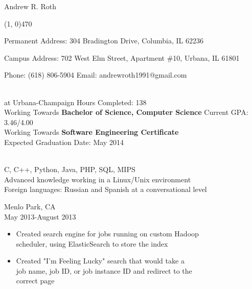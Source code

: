 \documentclass[11pt]{article}
\begin{document}
  \centerline{{\Huge \sc Andrew R. Roth}}
  \noindent\line(1, 0){470}\\
  \centerline{
    Permanent Address:
      304 Bradington Drive,
      Columbia,
      IL 62236
  }
  \centerline{
    Campus Address:
      702 West Elm Street,
      Apartment \#10,
      Urbana,
      IL 61801
  }
  \centerline{
    Phone: (618) 806-5904
    \indent Email: andrewroth1991@gmail.com
  }

  \bigskip
  \bigskip

  \\
     at Urbana-Champaign \hfill 
      Hours Completed: 138\\
    \indent Working Towards {\bf Bachelor of Science, Computer Science} \hfill 
      Current GPA: 3.46/4.00\\
    \indent Working Towards {\bf Software Engineering Certificate}\\
    \indent Expected Graduation Date: May 2014

  \bigskip
  \bigskip

  \\
    \indent C, C++, Python, Java, PHP, SQL, MIPS\\
    \indent Advanced knowledge working in a Linux/Unix environment\\
    \indent Foreign languages: Russian and Spanish at a conversational level

  \bigskip
  \bigskip

    \smallskip

     \hfill Menlo Park, CA\\
     \hfill May 2013-August 2013
    \begin{itemize}[noitemsep,topsep=0pt,leftmargin=52pt]
      \item Created search engine for jobs running on custom Hadoop\\
        scheduler, using ElasticSearch to store the index
      \item Created "I'm Feeling Lucky" search that would take a\\
        job name, job ID, or job instance ID and redirect to the\\
        correct page
    \end{itemize}
    \medskip
\end{document}
